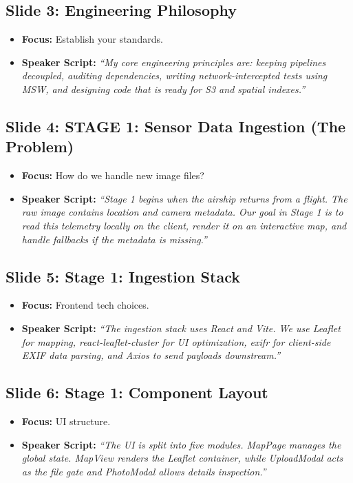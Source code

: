 \documentclass[11pt]{article}
\begin{document}
\subsection{Slide 3: Engineering Philosophy}
\begin{itemize}
    \item \textbf{Focus:} Establish your standards.
    \item \textbf{Speaker Script:} 
    \textit{``My core engineering principles are: keeping pipelines decoupled, auditing dependencies, writing network-intercepted tests using MSW, and designing code that is ready for S3 and spatial indexes.''}
\end{itemize}

\subsection{Slide 4: STAGE 1: Sensor Data Ingestion (The Problem)}
\begin{itemize}
    \item \textbf{Focus:} How do we handle new image files?
    \item \textbf{Speaker Script:} 
    \textit{``Stage 1 begins when the airship returns from a flight. The raw image contains location and camera metadata. Our goal in Stage 1 is to read this telemetry locally on the client, render it on an interactive map, and handle fallbacks if the metadata is missing.''}
\end{itemize}

\subsection{Slide 5: Stage 1: Ingestion Stack}
\begin{itemize}
    \item \textbf{Focus:} Frontend tech choices.
    \item \textbf{Speaker Script:} 
    \textit{``The ingestion stack uses React and Vite. We use Leaflet for mapping, react-leaflet-cluster for UI optimization, exifr for client-side EXIF data parsing, and Axios to send payloads downstream.''}
\end{itemize}

\subsection{Slide 6: Stage 1: Component Layout}
\begin{itemize}
    \item \textbf{Focus:} UI structure.
    \item \textbf{Speaker Script:} 
    \textit{``The UI is split into five modules. MapPage manages the global state. MapView renders the Leaflet container, while UploadModal acts as the file gate and PhotoModal allows details inspection.''}
\end{itemize}
\end{document}
